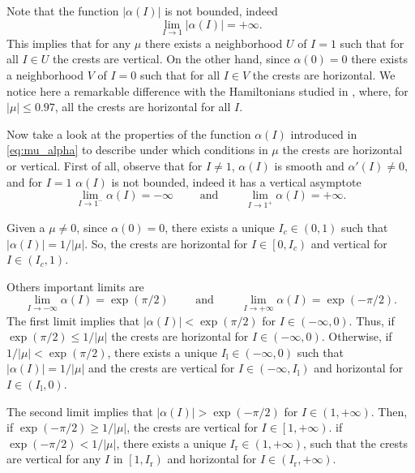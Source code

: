 \documentclass[a4paper,10pt]{article}
\theoremstyle{definition}
\begin{document}
Note that the function $\left|\alpha(I)\right|$ is not bounded, indeed
\begin{equation*}
\lim_{I\rightarrow 1}\left|\alpha(I)\right| = +\infty.
\end{equation*}
This implies that for any $\mu$ there exists a neighborhood $U$ of $I = 1$ such that for all $I\in U$ the crests are vertical.
On the other hand, since $\alpha( 0 ) = 0 $ there exists a neighborhood $V$ of $I = 0$ such that for all $I\in V$ the crests are horizontal.
We notice here a remarkable difference with the Hamiltonians studied in \cite{Delshams2011,Delshams2017}, where, for $\left|\mu\right| \leq 0.97$, all the crests are horizontal for all $I$.

Now take a look at the properties of the function $\alpha(I)$ introduced in \eqref{eq:mu_alpha} to describe under which conditions in $\mu$ the crests are horizontal or vertical.
First of all, observe that for $I\neq 1$, $\alpha(I)$ is smooth and $\alpha'(I)\neq 0, $ and for $I = 1$ $\alpha(I)$ is not bounded, indeed it has a vertical asymptote
\begin{equation*}
\lim_{I\rightarrow 1^-} \alpha(I) = -\infty \quad\quad \text{ and }\quad\quad\lim_{I\rightarrow 1^+}\alpha(I) = +\infty.
\end{equation*}

Given a $\mu\neq0$, since $\alpha(0) = 0$, there exists a unique $I_c \in (0,1)$ such that $\left|\alpha(I)\right| = 1/\left|\mu\right|$.
So, the crests are horizontal for $I\in\left[ 0 , I_c\right)$ and vertical for $I\in(I_c , 1)$.

Others important limits are
\begin{equation*}
\lim_{I\rightarrow -\infty}\alpha(I) = \exp(\pi/2) \quad\quad \text{ and }\quad\quad \lim_{I\rightarrow + \infty } \alpha(I) = \exp(-\pi/2).
\end{equation*}
The first limit implies that $\left|\alpha(I)\right| < \exp( \pi/2)$ for $I\in\left(-\infty , 0\right)$.
Thus, if $\exp(\pi/2)\leq 1/\left|\mu\right|$ the crests are horizontal for $I\in(-\infty , 0)$.
Otherwise, if $1/\left|\mu\right| < \exp(\pi/2 )$, there exists a unique $I_{\text{l}}\in(-\infty , 0)$ such that $\left|\alpha(I)\right| = 1/\left|\mu\right|$ and the crests are vertical for $I\in(-\infty , I_{\text{l}})$ and horizontal for $I\in\left(I_{\text{l}} ,0\right)$.

The second limit implies that $\left|\alpha(I)\right| > \exp(-\pi/2)$ for $I\in(1 , +\infty)$.
Then, if $\exp( -\pi/2 )\geq 1/\left|\mu\right|$, the crests are vertical for $I\in\left[1 , +\infty\right)$.
if $\exp( -\pi/2 )< 1/\left|\mu\right|$, there exists a unique $I_{\text{r}}\in(1 , + \infty)$, such that the crests are vertical for any $I$ in $\left[1 , I_{\text{r}}\right)$ and horizontal for $I\in(I_\text{r} , +\infty)$.
\end{document}
